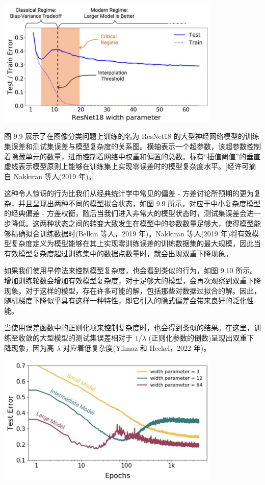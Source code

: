 \documentclass[10pt]{report}
\begin{document}
\begin{center}
\includegraphics[max width=0.8\textwidth]{images/0194e279-9b28-703a-88f4-c3ac21e2010d_288_361_356_1087_623_0.jpg}
\end{center}
\hspace*{3em} 

图 9.9 展示了在图像分类问题上训练的名为 ResNet18 的大型神经网络模型的训练集误差和测试集误差与模型复杂度的关系图。横轴表示一个超参数，该超参数控制着隐藏单元的数量，进而控制着网络中权重和偏置的总数。标有“插值阈值”的垂直虚线表示模型原则上能够在训练集上实现零误差时的模型复杂度水平。[经许可摘自 Nakkiran 等人(2019 年)。]

这种令人惊讶的行为比我们从经典统计学中常见的偏差 - 方差讨论所预期的更为复杂，并且呈现出两种不同的模型拟合状态，如图 9.9 所示，对应于中小复杂度模型的经典偏差 - 方差权衡，随后当我们进入非常大的模型状态时，测试集误差会进一步降低。这两种状态之间的转变大致发生在模型中的参数数量足够大，使得模型能够精确拟合训练数据时(Belkin 等人，2019 年)。Nakkiran 等人(2019 年)将有效模型复杂度定义为模型能够在其上实现零训练误差的训练数据集的最大规模，因此当有效模型复杂度超过训练集中的数据点数量时，就会出现双重下降现象。

如果我们使用早停法来控制模型复杂度，也会看到类似的行为，如图 9.10 所示。增加训练轮数会增加有效模型复杂度，对于足够大的模型，会再次观察到双重下降现象。对于这样的模型，存在许多可能的解，包括那些对数据过拟合的解。因此，随机梯度下降似乎具有这样一种特性，即它引入的隐式偏差会带来良好的泛化性能。

当使用误差函数中的正则化项来控制复杂度时，也会得到类似的结果。在这里，训练至收敛的大型模型的测试集误差相对于 \(1/\lambda\) (正则化参数的倒数)呈现出双重下降现象，因为高 \(\lambda\) 对应着低复杂度(Yilmaz 和 Heckel，2022 年)。

\begin{center}
\includegraphics[max width=0.8\textwidth]{images/0194e279-9b28-703a-88f4-c3ac21e2010d_289_397_354_998_585_0.jpg}
\end{center}
\hspace*{3em} 
\end{document}
